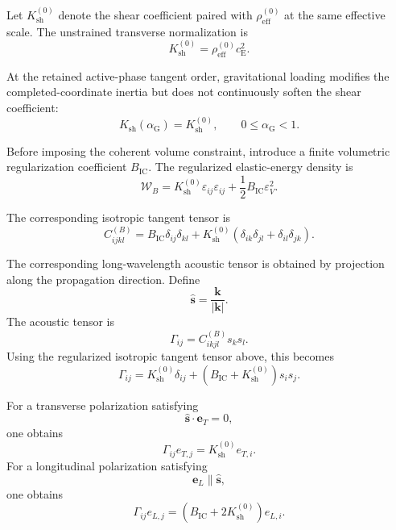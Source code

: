 Let $K_{\mathrm{sh}}^{(0)}$ denote the shear coefficient paired with $\rho_{\mathrm{eff}}^{(0)}$ at the same effective scale. The unstrained transverse normalization is
\begin{equation}
    K_{\mathrm{sh}}^{(0)} = \rho_{\mathrm{eff}}^{(0)}c_{\mathrm{E}}^2.
\end{equation}

At the retained active-phase tangent order, gravitational loading modifies the completed-coordinate inertia but does not continuously soften the shear coefficient:
\begin{equation}
    K_{\mathrm{sh}}(\alpha_{\mathrm{G}}) = K_{\mathrm{sh}}^{(0)}, \qquad 0 \leq \alpha_{\mathrm{G}} < 1.
\end{equation}

Before imposing the coherent volume constraint, introduce a finite volumetric regularization coefficient $B_{\mathrm{IC}}$. The regularized elastic-energy density is
\begin{equation}
    \mathcal{W}_B = K_{\mathrm{sh}}^{(0)} \varepsilon_{ij}\varepsilon_{ij} + \frac{1}{2} B_{\mathrm{IC}} \varepsilon_V^2.
\end{equation}

The corresponding isotropic tangent tensor is
\begin{equation}
    C_{ijkl}^{(B)} = B_{\mathrm{IC}}\delta_{ij}\delta_{kl} + K_{\mathrm{sh}}^{(0)} \left( \delta_{ik}\delta_{jl} + \delta_{il}\delta_{jk} \right).
\end{equation}

The corresponding long-wavelength acoustic tensor is obtained by projection along the propagation direction. Define
\begin{equation}
    \hat{\mathbf s}
    =
    \frac{\mathbf k}{|\mathbf k|}.
\end{equation}
The acoustic tensor is
\begin{equation}
    \Gamma_{ij}
    =
    C_{ikjl}^{(B)}s_k s_l.
\end{equation}
Using the regularized isotropic tangent tensor above, this becomes
\begin{equation}
    \Gamma_{ij}
    =
    K_{\mathrm{sh}}^{(0)}\delta_{ij}
    +
    \left(
    B_{\mathrm{IC}}
    +
    K_{\mathrm{sh}}^{(0)}
    \right)
    s_i s_j.
\end{equation}

For a transverse polarization satisfying
\begin{equation}
    \hat{\mathbf s}\cdot\mathbf e_T=0,
\end{equation}
one obtains
\begin{equation}
    \Gamma_{ij}e_{T,j}
    =
    K_{\mathrm{sh}}^{(0)}e_{T,i}.
\end{equation}
For a longitudinal polarization satisfying
\begin{equation}
    \mathbf e_L\parallel\hat{\mathbf s},
\end{equation}
one obtains
\begin{equation}
    \Gamma_{ij}e_{L,j}
    =
    \left(
    B_{\mathrm{IC}}
    +
    2K_{\mathrm{sh}}^{(0)}
    \right)
    e_{L,i}.
\end{equation}

